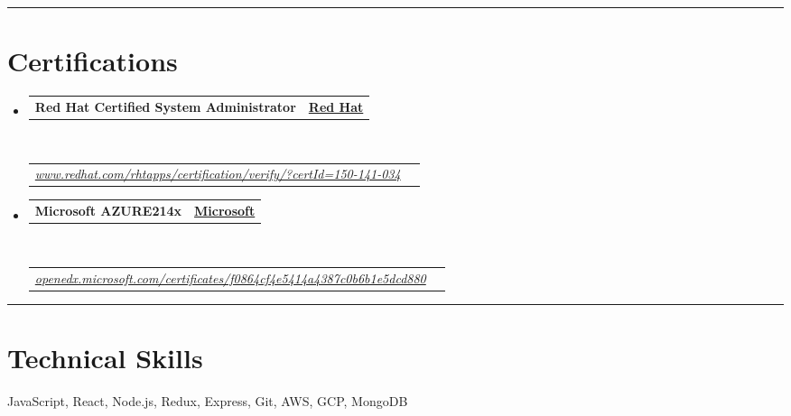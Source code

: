 \documentclass[10pt,a4paper,hidelinks]{article}
\makeatletter
\newenvironment{indentsection}[1]%
{\begin{list}{}%
	{\setlength{\leftmargin}{#1}}%
	\item[]%
}
{\end{list}}
\newcommand{\headerrow}[2]
{\begin{tabular*}{\linewidth}{l@{\extracolsep{\fill}}r}
	#1 &
	#2 \\
\end{tabular*}}
\makeatother
\begin{document}
\hrule
\vspace{-0.4em}
\section*{Certifications}

\begin{itemize}
	\parskip=0.1em

	\item 
	\headerrow
		{\textbf{Red Hat Certified System Administrator}}
		{{\href{https://www.redhat.com/}{\textbf{Red Hat}}}}
	\\
	\headerrow
	    {\emph{\href{https://www.redhat.com/rhtapps/certification/verify/?certId=150-141-034}{www.redhat.com/rhtapps/certification/verify/?certId=150-141-034}}}
		{\emph{}}
	
	\item 
	\headerrow
		{\textbf{Microsoft AZURE214x}}
		{{\href{https://www.microsoft.com/}{\textbf{Microsoft}}}}
	\\
	\headerrow
	    {\emph{\href{https://openedx.microsoft.com/certificates/f0864cf4e5414a4387c0b6b1e5dcd880}{openedx.microsoft.com/certificates/f0864cf4e5414a4387c0b6b1e5dcd880}}}
		{\emph{}}

\end{itemize}


\hrule
\vspace{-0.4em}
\section*{Technical Skills}

\begin{indentsection}{\parindent}
\begin{description*}
    JavaScript, React, Node.js, Redux, Express, Git, AWS, GCP, MongoDB 
\end{description*}
\end{indentsection}
\end{document}
